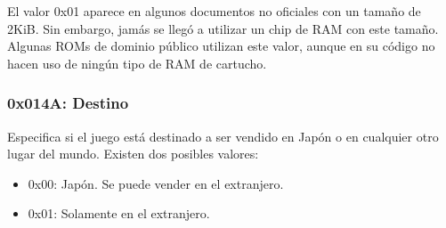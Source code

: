 El valor 0x01 aparece en algunos documentos no oficiales con un tamaño de 2KiB. Sin embargo, jamás se llegó a utilizar un chip de RAM con este tamaño. Algunas ROMs de dominio público utilizan este valor, aunque en su código no hacen uso de ningún tipo de RAM de cartucho.

\subsubsection{0x014A: Destino}
Especifica si el juego está destinado a ser vendido en Japón o en cualquier otro lugar del mundo. Existen dos posibles valores:

\begin{itemize}
    \item 0x00: Japón. Se puede vender en el extranjero.
    \item 0x01: Solamente en el extranjero.
\end{itemize}

